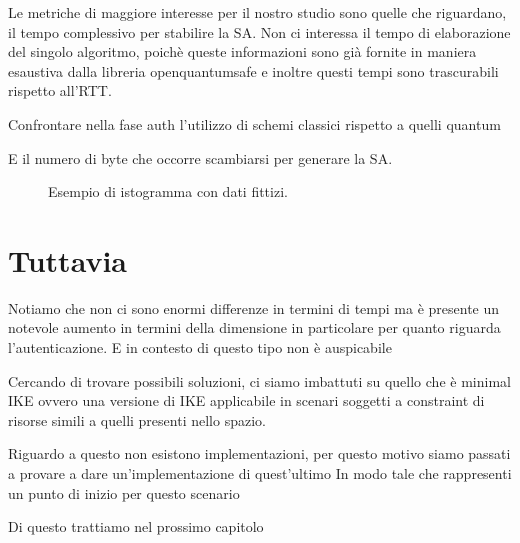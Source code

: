 Le metriche di maggiore interesse per il nostro studio sono quelle che riguardano, il tempo complessivo per stabilire la SA. 
Non ci interessa il tempo di elaborazione del singolo algoritmo, poichè queste informazioni sono già fornite in maniera esaustiva
dalla libreria openquantumsafe e inoltre questi tempi sono trascurabili rispetto all'RTT.

Confrontare nella fase auth l'utilizzo di schemi classici rispetto a quelli quantum


E il numero di byte che occorre scambiarsi per generare la SA.


\begin{figure} 
    \centering 
    \caption{Esempio di istogramma con dati fittizi.} 
\end{figure}

\section{Tuttavia}

Notiamo che non ci sono enormi differenze in termini di tempi ma è presente un 
notevole aumento in termini della dimensione in particolare per quanto riguarda l'autenticazione.
E in contesto di questo tipo non è auspicabile

Cercando di trovare possibili soluzioni, ci siamo imbattuti su quello che è minimal IKE ovvero
una versione di IKE applicabile in scenari soggetti a constraint di risorse simili a quelli presenti nello spazio.

Riguardo a questo non esistono implementazioni, per questo motivo siamo passati a provare a dare un'implementazione di quest'ultimo
In modo tale che rappresenti un punto di inizio per questo scenario

Di questo trattiamo nel prossimo capitolo


